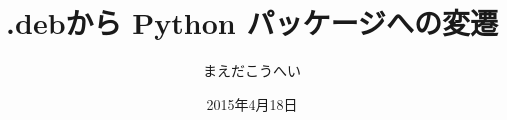 




\documentclass[cjk,dvipdfmx,12pt]{beamer}
\usepackage{monthlypresentation}
\usepackage{listings}



\title{.debから Python パッケージへの変遷}
\subtitle{}
\author{まえだこうへい}
\date{2015年4月18日}


